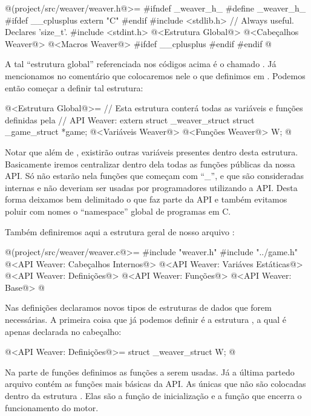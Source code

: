 \iniciocodigo
@(project/src/weaver/weaver.h@>=
#ifndef _weaver_h_
#define _weaver_h_
#ifdef __cplusplus
  extern "C" {
#endif
#include <stdlib.h> // Always useful. Declares 'size_t'.
#include <stdint.h>
@<Estrutura Global@>
@<Cabeçalhos Weaver@>
@<Macros Weaver@>
#ifdef __cplusplus
  }
#endif
#endif
@
\fimcodigo


A tal ``estrutura global'' referenciada nos códigos acima é
o  chamado . Já mencionamos no
comentário que colocaremos nele
o  que definimos
em . Podemos então começar a definir tal estrutura:

\iniciocodigo
@<Estrutura Global@>=
// Esta estrutura conterá todas as variáveis e funções definidas pela
// API Weaver:
extern struct _weaver_struct{
  struct _game_struct *game;
  @<Variáveis Weaver@>
  @<Funções Weaver@>
} W;
@
\fimcodigo

Notar que além de , existirão outras variáveis
presentes dentro desta estrutura. Basicamente iremos centralizar
dentro dela todas as funções públicas da nossa API. Só não estarão
nela funções que começam com ``\_'', e que são consideradas internas e
não deveriam ser usadas por programadores utilizando a API. Desta
forma deixamos bem delimitado o que faz parte da API e também evitamos
poluir com nomes o ``namespace'' global de programas em C.

Também definiremos aqui a estrutura geral de nosso
arquivo :

\iniciocodigo
@(project/src/weaver/weaver.c@>=
#include "weaver.h"
#include "../game.h"
@<API Weaver: Cabeçalhos Internos@>
@<API Weaver: Variáves Estáticas@>
@<API Weaver: Definições@>
@<API Weaver: Funções@>
@<API Weaver: Base@>
@
\fimcodigo

Nas definições declaramos novos tipos de estruturas de dados que forem
necessárias. A primeira coisa que já podemos definir é a
estrutura , a qual é apenas declarada no cabeçalho:

\iniciocodigo
@<API Weaver: Definições@>=
struct _weaver_struct W;
@
\fimcodigo

Na parte de funções definimos as funções a serem usadas. Já a última
partedo arquivo contém as funções mais básicas da API. As únicas que
não são colocadas dentro da estrutura . Elas são a
função de inicialização e a função que encerra o funcionamento do
motor.

